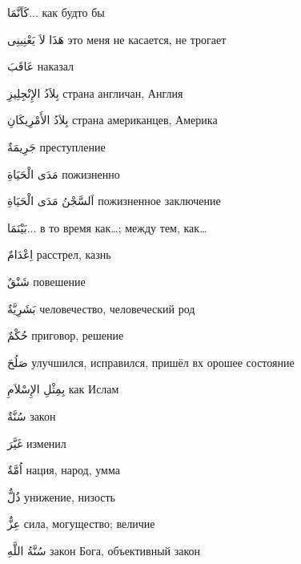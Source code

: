 \documentclass[a5paper]{article}
\newcommand\textstyleDropCaps[1]{#1}
\newcommand\textstyleCaptioncharacters[1]{#1}
\begin{document}
\textstyleCaptioncharacters{كَاَنَّمَا... }\textstyleDropCaps{как будто бы‎}

\textstyleCaptioncharacters{هَذَا لاَ يَعْنِينِى }\textstyleDropCaps{это меня не касается, не трогает‎}

\textstyleCaptioncharacters{عَاقَبَ }\textstyleDropCaps{наказал‎}

\textstyleCaptioncharacters{بِلاَدُ الإِنْجِلِيزِ }\textstyleDropCaps{страна ан­гличан, Англия‎}

\textstyleCaptioncharacters{بِلاَدُ الأَمْرِيكَانِ }\textstyleDropCaps{страна американцев, Америка‎}

\textstyleCaptioncharacters{جَرِيمَةٌ }\textstyleDropCaps{преступление‎}

\textstyleCaptioncharacters{مَدَى الْحَيَاةِ }\textstyleDropCaps{пожизнен­но‎}

\textstyleCaptioncharacters{اَلسَّجْنُ مَدَى الْحَيَاةِ }\textstyleDropCaps{пожизненное заключение‎}

\textstyleCaptioncharacters{بَيْنَمَا... }\textstyleDropCaps{в то время как…; между тем, как…‎}

\textstyleCaptioncharacters{اِعْدَامٌ }\textstyleDropCaps{расстрел, казнь‎}

\textstyleCaptioncharacters{شَنْقٌ }\textstyleDropCaps{повешение‎}

\textstyleCaptioncharacters{بَشَرِيَّةٌ }\textstyleDropCaps{человечество, че­ловеческий род‎}

\textstyleCaptioncharacters{حُكْمٌ }\textstyleDropCaps{приговор, решение‎}

\textstyleCaptioncharacters{صَلُحَ }\textstyleDropCaps{улучшился, испра­вился, пришёл вх орошее состояние‎}

\textstyleCaptioncharacters{بِمِثْلِ الإِسْلاَمِ }\textstyleDropCaps{как Ислам‎}

\textstyleCaptioncharacters{سُنَّةٌ }\textstyleDropCaps{закон‎}

\textstyleCaptioncharacters{غَيَّرَ }\textstyleDropCaps{изменил‎}

\textstyleCaptioncharacters{اُمَّةٌ }\textstyleDropCaps{нация, народ, умма‎}

\textstyleCaptioncharacters{ذُلٌّ }\textstyleDropCaps{унижение, низость‎}

\textstyleCaptioncharacters{عِزٌّ }\textstyleDropCaps{сила, могущество; ве­личие‎}

\textstyleCaptioncharacters{سُنَّةُ اللَّهِ }\textstyleDropCaps{закон Бога, объективный закон‎}
\end{document}
